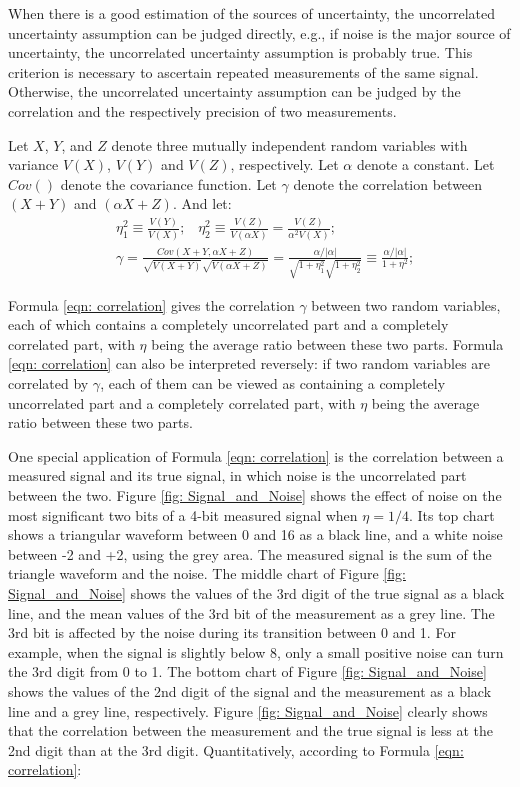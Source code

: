 \documentclass[twoside]{article}
\numberwithin{equation}{section}
\newcommand{\eqspace}{\;\;\;}
\begin{document}
When there is a good estimation of the sources of uncertainty, the uncorrelated uncertainty assumption can be judged directly, e.g., if noise \cite{Statistical_Methods}\cite{Precisions_Physical_Measurements} is the major source of uncertainty, the uncorrelated uncertainty assumption is probably true.  
This criterion is necessary to ascertain repeated measurements of the same signal.   
Otherwise, the uncorrelated uncertainty assumption can be judged by the correlation and the respectively precision of two measurements.  

Let $X$, $Y$, and $Z$ denote three mutually independent random variables \cite{Probability_Statistics} with variance $V(X)$, $V(Y)$ and $V(Z)$, respectively.  
Let $\alpha$ denote a constant.  
Let $Cov()$ denote the covariance function.  
Let $\gamma$ denote the correlation between $(X + Y)$ and $(\alpha X + Z)$. And let:
\begin{align}
& \eta _{1} ^{2} \equiv \frac{V(Y)}{V(X)}; \eqspace
 \eta _{2} ^{2} \equiv \frac{V(Z)}{V(\alpha X)} =\frac{V(Z)}{\alpha ^{2} V(X)}; \\
\label{eqn: correlation}
& \gamma =\frac{Cov(X+Y,\alpha X+Z)}{\sqrt{V(X+Y)} \sqrt{V(\alpha X+Z)}}  =\frac{\alpha /|\alpha |}{\sqrt{1+\eta _{1} ^{2} } \sqrt{1+\eta _{2} ^{2}}} \equiv \frac{\alpha /|\alpha |}{1+\eta ^{2}};
\end{align}

Formula \eqref{eqn: correlation} gives the correlation $\gamma$ between two random variables, each of which contains a completely uncorrelated part and a completely correlated part, with $\eta$ being the average ratio between these two parts.  
Formula \eqref{eqn: correlation} can also be interpreted reversely: if two random variables are correlated by $\gamma$, each of them can be viewed as containing a completely uncorrelated part and a completely correlated part, with $\eta$ being the average ratio between these two parts.

One special application of Formula \eqref{eqn: correlation} is the correlation between a measured signal and its true signal, in which noise is the uncorrelated part between the two.  
Figure \ref{fig: Signal_and_Noise} shows the effect of noise on the most significant two bits of a 4-bit measured signal when $\eta=1/4$.  
Its top chart shows a triangular waveform between 0 and 16 as a black line, and a white noise between -2 and +2, using the grey area.  
The measured signal is the sum of the triangle waveform and the noise.  
The middle chart of Figure \ref{fig: Signal_and_Noise} shows the values of the 3rd digit of the true signal as a black line, and the mean values of the 3rd bit of the measurement as a grey line.  
The 3rd bit is affected by the noise during its transition between 0 and 1.  
For example, when the signal is slightly below 8, only a small positive noise can turn the 3rd digit from 0 to 1.  
The bottom chart of Figure \ref{fig: Signal_and_Noise} shows the values of the 2nd digit of the signal and the measurement as a black line and a grey line, respectively.  
Figure \ref{fig: Signal_and_Noise} clearly shows that the correlation between the measurement and the true signal is less at the 2nd digit than at the 3rd digit.  
Quantitatively, according to Formula \eqref{eqn: correlation}:
\end{document}
